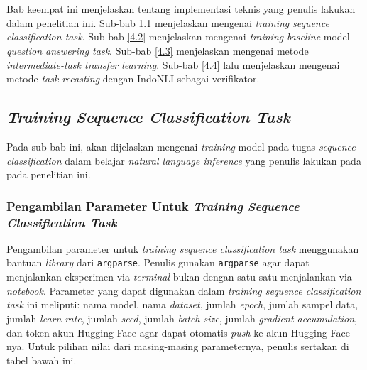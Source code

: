 \chapter{\babEmpat}
\label{bab:4}
Bab keempat ini menjelaskan tentang implementasi teknis yang penulis lakukan dalam penelitian ini. Sub-bab \ref{4.1} menjelaskan mengenai \emph{training} \emph{sequence classification task}. Sub-bab \ref{4.2} menjelaskan mengenai  \emph{training} \emph{baseline} model \emph{question answering task}. Sub-bab \ref{4.3} menjelaskan mengenai metode \emph{intermediate-task transfer learning}. Sub-bab \ref{4.4} lalu menjelaskan mengenai metode \emph{task recasting} dengan IndoNLI sebagai verifikator.

\section{\emph{Training} \emph{Sequence Classification Task}}
\label{4.1}
Pada sub-bab ini, akan dijelaskan mengenai \emph{training} model pada tugas \emph{sequence classification} dalam belajar \emph{natural language inference} yang penulis lakukan pada pada penelitian ini. 

\subsection{Pengambilan Parameter Untuk \emph{Training Sequence Classification Task}}
\label{4.1.1}
Pengambilan parameter untuk \emph{training sequence classification task} menggunakan bantuan \emph{library} dari \texttt{argparse}. Penulis gunakan \texttt{argparse} agar dapat menjalankan eksperimen via \emph{terminal} bukan dengan satu-satu menjalankan via \emph{notebook}. Parameter yang dapat digunakan dalam \emph{training sequence classification task} ini meliputi: nama model, nama \emph{dataset}, jumlah \emph{epoch}, jumlah sampel data, jumlah \emph{learn rate}, jumlah \emph{seed}, jumlah \emph{batch size}, jumlah \emph{gradient accumulation}, dan token akun Hugging Face agar dapat otomatis \emph{push} ke akun Hugging Face-nya. Untuk pilihan nilai dari masing-masing parameternya, penulis sertakan di tabel bawah ini.

